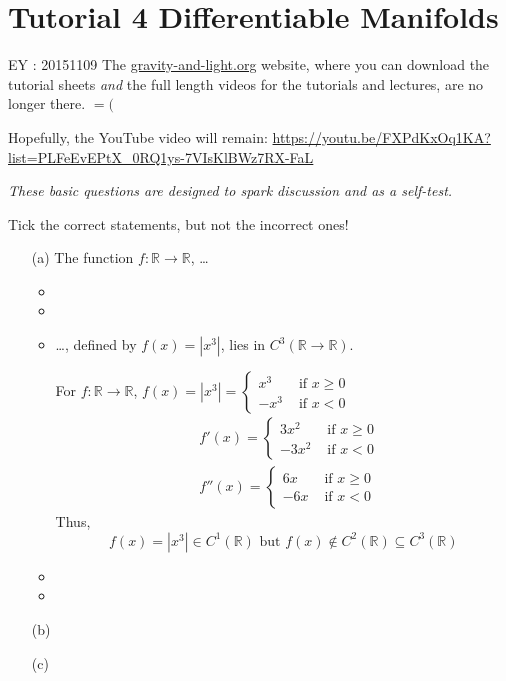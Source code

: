 \section*{Tutorial 4 Differentiable Manifolds}

EY : 20151109 The \url{gravity-and-light.org} website, where you can download the tutorial sheets \emph{and} the full length videos for the tutorials and lectures, are no longer there.  $=($  

Hopefully, the YouTube video will remain: \url{https://youtu.be/FXPdKxOq1KA?list=PLFeEvEPtX_0RQ1ys-7VIsKlBWz7RX-FaL}

 \emph{These basic questions are designed to spark discussion and as a self-test.}

Tick the correct statements, but not the incorrect ones!

\begin{enumerate}
  \item[(a)] The function $f: \mathbb{R} \to \mathbb{R}$, \dots
    \begin{itemize}
      \item  
      \item
      \item \dots , defined by $f(x) = |x^3|$, lies in $C^3(\mathbb{R} \to \mathbb{R})$.  

 For $f: \mathbb{R} \to \mathbb{R}$, $f(x) = |x^3| = \begin{cases} x^3 & \text{ if } x \geq 0 \\
  -x^3 & \text{ if } x < 0 \end{cases}$ 
\[
\begin{aligned}
  & f'(x) = \begin{cases} 3x^2  & \text{ if } x \geq 0 \\
    -3x^2 & \text{ if } x < 0 \end{cases} \\ 
  & f''(x) = \begin{cases} 6x  & \text{ if } x \geq 0 \\
    -6x & \text{ if } x < 0 \end{cases} 
\end{aligned}
\]
Thus, 
\[
\boxed{ f(x) = |x^3| \in C^1(\mathbb{R}) \text{ but } f(x) \notin C^2(\mathbb{R}) \subseteq C^3(\mathbb{R}) }
\]
      \item
      \item
\end{itemize}
  \item[(b)]
  \item[(c)]
\end{enumerate}

